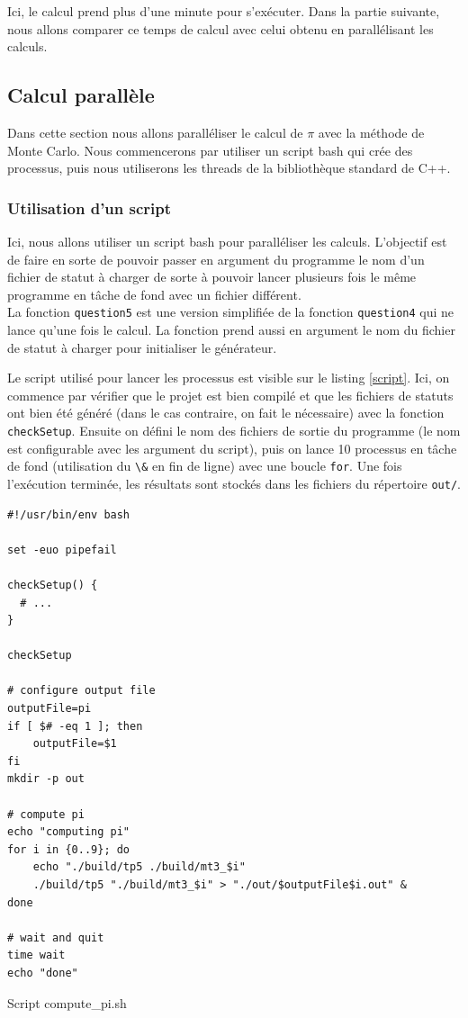 \documentclass[a4paper]{article}
\begin{document}
Ici, le calcul prend plus d'une minute pour s'exécuter. Dans la partie suivante,
nous allons comparer ce temps de calcul avec celui obtenu en parallélisant les
calculs.

\subsection{Calcul parallèle}

Dans cette section nous allons paralléliser le calcul de $\pi$ avec la méthode
de Monte Carlo. Nous commencerons par utiliser un script bash qui crée des
processus, puis nous utiliserons les threads de la bibliothèque standard de C++.

\subsubsection{Utilisation d'un script}
\label{sec:script}

Ici, nous allons utiliser un script bash pour paralléliser les calculs.
L'objectif est de faire en sorte de pouvoir passer en argument du programme le
nom d'un fichier de statut à charger de sorte à pouvoir lancer plusieurs fois le
même programme en tâche de fond avec un fichier différent.\\

La fonction \lstinline{question5} est une version simplifiée de la fonction
\lstinline{question4} qui ne lance qu'une fois le calcul. La fonction prend
aussi en argument le nom du fichier de statut à charger pour initialiser le
générateur.

Le script utilisé pour lancer les processus est visible sur le listing
\ref{script}. Ici, on commence par vérifier que le projet est bien compilé et
que les fichiers de statuts ont bien été généré (dans le cas contraire, on fait
le nécessaire) avec la fonction \lstinline{checkSetup}. Ensuite on défini le nom
des fichiers de sortie du programme (le nom est configurable avec les argument
du script), puis on lance 10 processus en tâche de fond (utilisation du
\lstinline{\&} en fin de ligne) avec une boucle \lstinline{for}. Une fois
l'exécution terminée, les résultats sont stockés dans les fichiers du répertoire
\lstinline{out/}.

\begin{listing}[ht!]
\begin{verbatim}
#!/usr/bin/env bash

set -euo pipefail

checkSetup() {
  # ...
}

checkSetup

# configure output file
outputFile=pi
if [ $# -eq 1 ]; then
    outputFile=$1
fi
mkdir -p out

# compute pi
echo "computing pi"
for i in {0..9}; do
    echo "./build/tp5 ./build/mt3_$i"
    ./build/tp5 "./build/mt3_$i" > "./out/$outputFile$i.out" &
done

# wait and quit
time wait
echo "done"
\end{verbatim}
\caption{Script compute\_pi.sh}
\label{script}
\end{listing}
\clearpage
\end{document}
